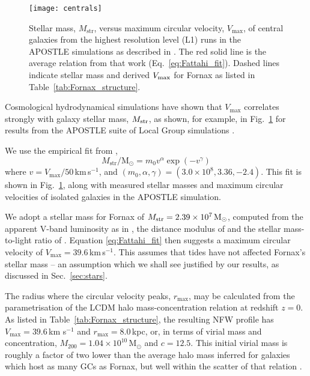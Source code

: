 \documentclass[fleqn,usenatbib]{mnras}
\begin{document}
\begin{figure}
	\texttt{[image: centrals]}
	\caption{Stellar mass, $M_\mathrm{str}$, versus maximum circular velocity, $V_\mathrm{max}$, of central galaxies 	from the highest resolution level (L1) runs in the APOSTLE simulations as described in \citet{Fattahi2018}. The red solid line is the average relation from that work (Eq.~\ref{eq:Fattahi_fit}). Dashed lines indicate stellar mass and derived $V_{\rm max}$ for Fornax as listed in Table~\ref{tab:Fornax_structure}.}
    \label{fig:APOSTLE}
\end{figure}

Cosmological hydrodynamical simulations have shown that $V_\mathrm{max}$ correlates strongly with galaxy stellar mass, $M_{\rm str}$, as shown, for example, in Fig.~\ref{fig:APOSTLE} for results from the APOSTLE suite of Local Group simulations \citep{Sawala16,Fattahi2016a}.

We use the empirical fit from \citet{Fattahi2018}, 
\begin{equation}
\label{eq:Fattahi_fit}
 M_\mathrm{str} / \mathrm{M}_\odot = m_0 v^\alpha \exp(-v^\gamma)
\end{equation}
where $v = V_\mathrm{max}/50$\,km\,s$^{-1}$, and $(m_0, \alpha, \gamma)=(3.0\times10^8, 3.36, -2.4)$. This fit is shown in Fig.~\ref{fig:APOSTLE}, along with measured stellar masses and maximum circular velocities of isolated galaxies in the APOSTLE simulation.

We adopt a stellar mass for Fornax of $M_{\rm str} = 2.39 \times 10^7\,\mathrm{M_\odot}$, computed from the apparent V-band luminosity as in \citet{Irwin95}, the distance modulus of \citet{Pietrzynski2009} and the stellar mass-to-light ratio of \citet{Woo2008}. Equation \ref{eq:Fattahi_fit} then suggests a maximum circular velocity of $V_\mathrm{max} = 39.6$\,km\,s$^{-1}$. This assumes that tides have not affected Fornax's stellar mass -- an assumption which we shall see justified by our results, as discussed in Sec.~\ref{sec:stars}.

The radius where the  circular velocity peaks, $r_\mathrm{max}$, may be calculated from the \citet{Ludlow2016} parametrisation of the LCDM halo mass-concentration relation at redshift $z=0$. As listed in Table~\ref{tab:Fornax_structure}, the resulting NFW profile has $V_\mathrm{max} = 39.6$\,km s$^{-1}$ and $r_\mathrm{max} = 8.0$\,kpc, or, in terms of virial mass and concentration, $M_{200} = 1.04\times10^{10}$\,M$_\odot$ and $c=12.5$. This initial virial mass is roughly a factor of two lower than the average halo mass inferred for galaxies which host as many GCs as Fornax, but well within the scatter of that relation \citep[see; e.g.,][]{Forbes2018,Shao2020}.
\end{document}
